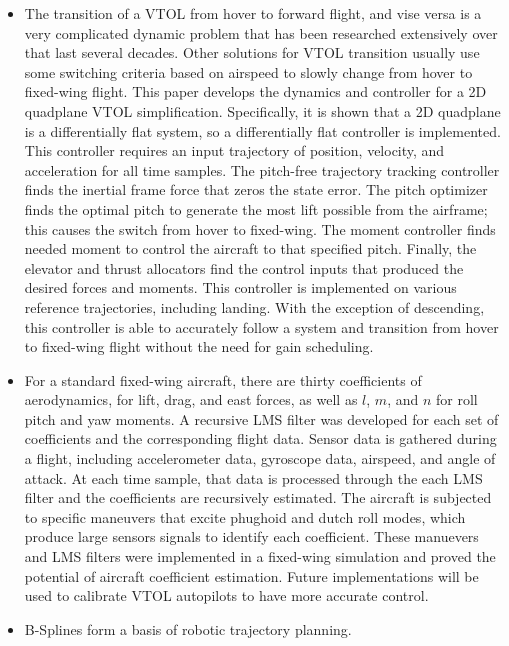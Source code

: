 \begin{itemize}
    \item The transition of a VTOL from hover to forward flight, and vise versa is a very complicated dynamic problem that has been researched extensively over that last several decades.
      Other solutions for VTOL transition usually use some switching criteria based on airspeed to slowly change from hover to fixed-wing flight.
      This paper develops the dynamics and controller for a 2D quadplane VTOL simplification.
      Specifically, it is shown that a 2D quadplane is a differentially flat system, so a differentially flat controller is implemented.
      This controller requires an input trajectory of position, velocity, and acceleration for all time samples.
      The pitch-free trajectory tracking controller finds the inertial frame force that zeros the state error.
      The pitch optimizer finds the optimal pitch to generate the most lift possible from the airframe; this causes the switch from hover to fixed-wing.
      The moment controller finds needed moment to control the aircraft to that specified pitch.
      Finally, the elevator and thrust allocators find the control inputs that produced the desired forces and moments.
      This controller is implemented on various reference trajectories, including landing. 
      With the exception of descending, this controller is able to accurately follow a system and transition from hover to fixed-wing flight without the need for gain scheduling.
    \item For a standard fixed-wing aircraft, there are thirty coefficients of aerodynamics, for lift, drag, and east forces, as well as $l$, $m$, and $n$ for roll pitch and yaw moments.
      A recursive LMS filter was developed for each set of coefficients and the corresponding flight data.
      Sensor data is gathered during a flight, including accelerometer data, gyroscope data, airspeed, and angle of attack.
      At each time sample, that data is processed through the each LMS filter and the coefficients are recursively estimated.
      The aircraft is subjected to specific maneuvers that excite phughoid and dutch roll modes, which produce large sensors signals to identify each coefficient.
      These manuevers and LMS filters were implemented in a fixed-wing simulation and proved the potential of aircraft coefficient estimation.
      Future implementations will be used to calibrate VTOL autopilots to have more accurate control.
    \item B-Splines form a basis of robotic trajectory planning. 

\end{itemize}
